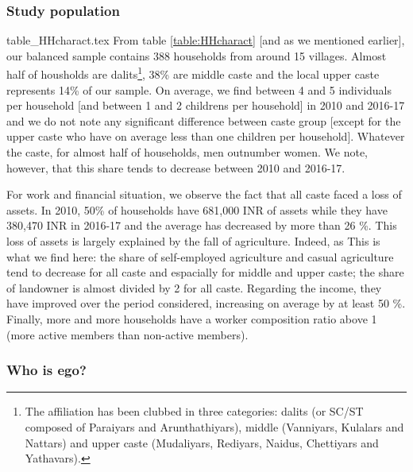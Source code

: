 \documentclass[a4paper, 11pt, onecolumn]{article}
\begin{document}
		\subsubsection{Study population}
		
{table_HHcharact.tex}
From table \ref{table:HHcharact} [and as we mentioned earlier], our balanced sample contains 388 households from around 15 villages.
Almost half of housholds are dalits\footnote{The  affiliation has been clubbed in three categories: dalits (or SC/ST composed of Paraiyars and Arunthathiyars), middle (Vanniyars, Kulalars and Nattars) and upper caste (Mudaliyars, Rediyars, Naidus, Chettiyars and Yathavars).}, 38\% are middle caste and the local upper caste represents 14\%  of our sample.
On average, we find between 4 and 5 individuals per household [and between 1 and 2 childrens per household] in 2010 and 2016-17 and we do not note any significant difference between caste group [except for the upper caste who have on average less than one children per household].
Whatever the caste, for almost half of households, men outnumber women. 
We note, however, that this share tends to decrease between 2010 and 2016-17.

For work and financial situation, we observe the fact that all caste faced a loss of assets.
In 2010, 50\% of households have 681,000 INR of assets while they have 380,470 INR in 2016-17 and the average has decreased by more than 26 \%.
This loss of assets is largely explained by the fall of agriculture.
Indeed, as %
This is what we find here: the share of self-employed agriculture and casual agriculture tend to decrease for all caste and espacially for middle and upper caste; the share of landowner is almost divided by 2 for all caste.
Regarding the income, they have improved over the period considered, increasing on average by at least 50 \%.
Finally, more and more households have a worker composition ratio above 1 (more active members than non-active members).

		\subsubsection{Who is ego?}
		
\end{document}
